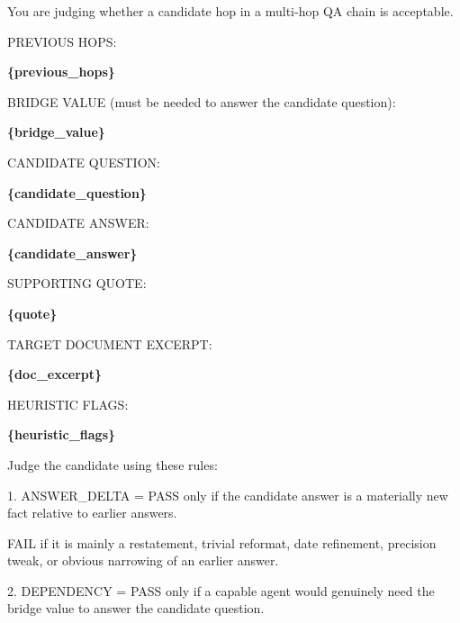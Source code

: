 \begin{tcolorbox}[colback=white, colframe=my-green, coltitle=black, parskip=5mm, title=\textbf{Transition Judge}, halign=flush left, enhanced, breakable, skin first=enhanced, skin middle=enhanced, skin last=enhanced]
\begin{scriptsize}
\ttfamily
\setlength{\parindent}{0pt}
You are judging whether a candidate hop in a multi-hop QA chain is acceptable.\par
\mbox{}\par
PREVIOUS HOPS:\par
\textcolor{my-green}{\textbf{\{previous\_hops\}}}\par
\mbox{}\par
BRIDGE VALUE (must be needed to answer the candidate question):\par
\textcolor{my-green}{\textbf{\{bridge\_value\}}}\par
\mbox{}\par
CANDIDATE QUESTION:\par
\textcolor{my-green}{\textbf{\{candidate\_question\}}}\par
\mbox{}\par
CANDIDATE ANSWER:\par
\textcolor{my-green}{\textbf{\{candidate\_answer\}}}\par
\mbox{}\par
SUPPORTING QUOTE:\par
\textcolor{my-green}{\textbf{\{quote\}}}\par
\mbox{}\par
TARGET DOCUMENT EXCERPT:\par
\textcolor{my-green}{\textbf{\{doc\_excerpt\}}}\par
\mbox{}\par
HEURISTIC FLAGS:\par
\textcolor{my-green}{\textbf{\{heuristic\_flags\}}}\par
\mbox{}\par
Judge the candidate using these rules:\par
1. ANSWER\_DELTA = PASS only if the candidate answer is a materially new fact relative to earlier answers.\par
   FAIL if it is mainly a restatement, trivial reformat, date refinement, precision tweak, or obvious narrowing of an earlier answer.\par
2. DEPENDENCY = PASS only if a capable agent would genuinely need the bridge value to answer the candidate question.\par

\end{scriptsize}
\end{tcolorbox}
